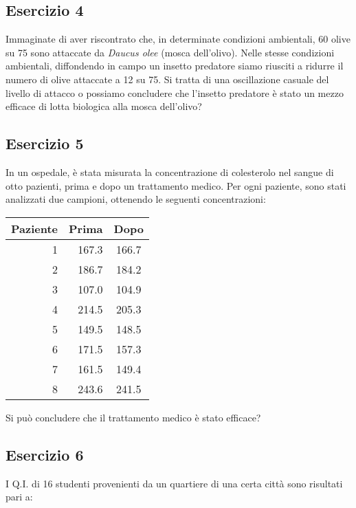 \documentclass[a4paper,12pt,oneside]{book}
\begin{document}
\hypertarget{esercizio-4-2}{%
\subsection{Esercizio 4}\label{esercizio-4-2}}

Immaginate di aver riscontrato che, in determinate condizioni ambientali, 60 olive su 75 sono attaccate da \emph{Daucus olee} (mosca dell'olivo). Nelle stesse condizioni ambientali, diffondendo in campo un insetto predatore siamo riusciti a ridurre il numero di olive attaccate a 12 su 75. Si tratta di una oscillazione casuale del livello di attacco o possiamo concludere che l'insetto predatore è stato un mezzo efficace di lotta biologica alla mosca dell'olivo?

\hypertarget{esercizio-5-2}{%
\subsection{Esercizio 5}\label{esercizio-5-2}}

In un ospedale, è stata misurata la concentrazione di colesterolo nel sangue di otto pazienti, prima e dopo un trattamento medico. Per ogni paziente, sono stati analizzati due campioni, ottenendo le seguenti concentrazioni:

\begin{longtable}[]{@{}rrc@{}}
\toprule
Paziente & Prima & Dopo \\
\midrule
\endhead
1 & 167.3 & 166.7 \\
2 & 186.7 & 184.2 \\
3 & 107.0 & 104.9 \\
4 & 214.5 & 205.3 \\
5 & 149.5 & 148.5 \\
6 & 171.5 & 157.3 \\
7 & 161.5 & 149.4 \\
8 & 243.6 & 241.5 \\
\bottomrule
\end{longtable}

Si può concludere che il trattamento medico è stato efficace?

\hypertarget{esercizio-6-1}{%
\subsection{Esercizio 6}\label{esercizio-6-1}}

I Q.I. di 16 studenti provenienti da un quartiere di una certa città sono risultati pari a:
\end{document}
